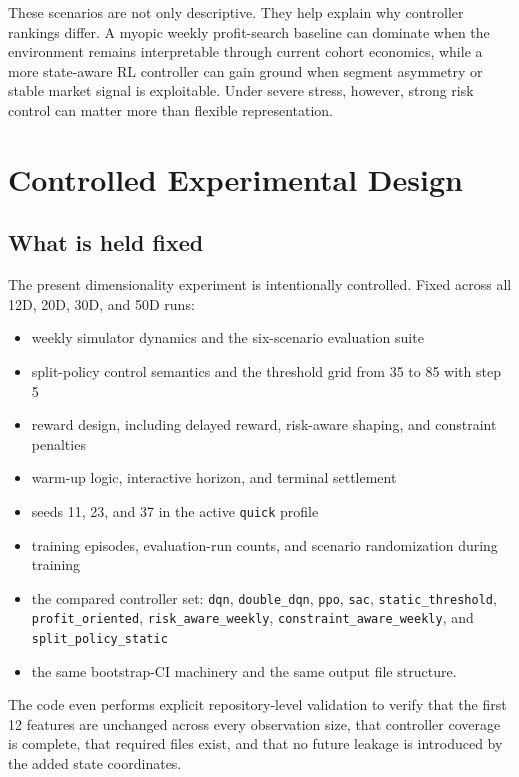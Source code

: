 \documentclass[12pt,a4paper]{article}
\begin{document}
These scenarios are not only descriptive. They help explain why controller rankings differ. A myopic weekly profit-search baseline can dominate when the environment remains interpretable through current cohort economics, while a more state-aware RL controller can gain ground when segment asymmetry or stable market signal is exploitable. Under severe stress, however, strong risk control can matter more than flexible representation.

\section{Controlled Experimental Design}

\subsection{What is held fixed}

The present dimensionality experiment is intentionally controlled. Fixed across all 12D, 20D, 30D, and 50D runs:
\begin{itemize}[leftmargin=*]
    \item weekly simulator dynamics and the six-scenario evaluation suite
    \item split-policy control semantics and the threshold grid from 35 to 85 with step 5
    \item reward design, including delayed reward, risk-aware shaping, and constraint penalties
    \item warm-up logic, interactive horizon, and terminal settlement
    \item seeds 11, 23, and 37 in the active \texttt{quick} profile
    \item training episodes, evaluation-run counts, and scenario randomization during training
    \item the compared controller set: \texttt{dqn}, \texttt{double\_dqn}, \texttt{ppo}, \texttt{sac}, \texttt{static\_threshold}, \texttt{profit\_oriented}, \texttt{risk\_aware\_weekly}, \texttt{constraint\_aware\_weekly}, and \texttt{split\_policy\_static}
    \item the same bootstrap-CI machinery and the same output file structure.
\end{itemize}

The code even performs explicit repository-level validation to verify that the first 12 features are unchanged across every observation size, that controller coverage is complete, that required files exist, and that no future leakage is introduced by the added state coordinates.
\end{document}
